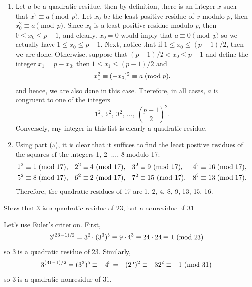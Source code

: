 \begin{solution}
    \begin{enumerate}
        \item Let $a$ be a quadratic residue, then by definition, there is an integer $x$ such that $x^2 \equiv a \pmod p$. Let $x_0$ be the least positive residue of $x$ modulo $p$, then $x_0^2 \equiv a \pmod p$. Since $x_0$ is a least positive residue modulo $p$, then $0 \leq x_0 \leq p-1$, and clearly, $x_0 = 0$ would imply that $a \equiv 0 \pmod p$ so we actually have $1 \leq x_0 \leq p-1$. Next, notice that if $1 \leq x_0 \leq (p-1)/2$, then we are done. Otherwise, suppose that $(p-1)/2 < x_0 \leq p-1$ and define the integer $x_1 = p - x_0$, then $1 \leq x_1 \leq (p-1)/2$ and
        $$x_1^2 \equiv (-x_0)^2 \equiv a\ (\mathrm{mod}\ p),$$
        and hence, we are also done in this case. Therefore, in all cases, $a$ is congruent to one of the integers
        $$1^2, \ 2^2, \ 3^2, \ \dots , \ \left(\frac{p-1}{2}\right)^2.$$
        Conversely, any integer in this list is clearly a quadratic residue.
        \item Using part (a), it is clear that it suffices to find the least positive residues of the squares of the integers 1, 2, ..., 8 modulo 17:
        \begin{align*}
            1^2 &\equiv 1 \ (\mathrm{mod}\ 17),& 2^2 &\equiv 4 \ (\mathrm{mod}\ 17), &  3^2 &\equiv 9 \ (\mathrm{mod}\ 17), & 4^2 &\equiv 16 \ (\mathrm{mod}\ 17),\\
            5^2 &\equiv 8 \ (\mathrm{mod}\ 17),&  6^2 &\equiv 2 \ (\mathrm{mod}\ 17), &  7^2 &\equiv 15 \ (\mathrm{mod}\ 17), & 8^2 &\equiv 13 \ (\mathrm{mod}\ 17).
        \end{align*}
        Therefore, the quadratic residues of 17 are 1, 2, 4, 8, 9, 13, 15, 16.\\
    \end{enumerate}
\end{solution}

\begin{exercise}
    Show that 3 is a quadratic residue of 23, but a nonresidue of 31. \\
\end{exercise}

\begin{solution}
    Let's use Euler's criterion. First,
    $$3^{(23 - 1)/2} = 3^2 \cdot (3^3)^{3} \equiv 9 \cdot 4^3 \equiv 24\cdot 24 \equiv 1 \ (\mathrm{mod}\ 23)$$
    so 3 is a quadratic residue of 23. Similarly,
    $$3^{(31 - 1)/2} = (3^3)^{5} \equiv - 4^5 = -(2^5)^2 \equiv -32^2 \equiv -1 \ (\mathrm{mod}\ 31)$$
    so 3 is a quadratic nonresidue of 31. \\
\end{solution}

